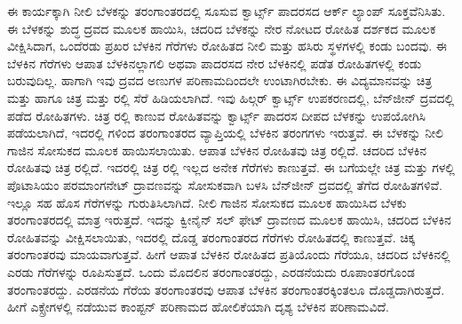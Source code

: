ಈ ಕಾರ್ಯಕ್ಕಾಗಿ ನೀಲಿ ಬೆಳಕನ್ನು  ತರಂಗಾಂತರದಲ್ಲಿ ಸೂಸುವ ಕ್ವಾರ್ಟ್ಸ್ ಪಾದರಸದ ಆರ್ಕ್ ಲ್ಯಾಂಪ್ ಸೂಕ್ತವೆನಿಸಿತು. ಈ ಬೆಳಕನ್ನು ಶುದ್ಧ ದ್ರವದ ಮೂಲಕ ಹಾಯಿಸಿ, ಚದರಿದ ಬೆಳಕನ್ನು ನೇರ ನೋಟದ ರೋಹಿತ ದರ್ಶಕದ ಮೂಲಕ ವೀಕ್ಷಿಸಿದಾಗ, ಒಂದೆರಡು ಪ್ರಖರ ಬೆಳಕಿನ ಗೆರೆಗಳು ರೋಹಿತದ ನೀಲಿ ಮತ್ತು ಹಸಿರು ಸ್ಥಳಗಳಲ್ಲಿ ಕಂಡು ಬಂದವು. ಈ ಬೆಳಕಿನ ಗೆರೆಗಳು ಆಪಾತ ಬೆಳಕಿನಲ್ಲಾಗಲಿ ಅಥವಾ ಪಾದರಸದ ನೇರ ಬೆಳಕಿನಲ್ಲಿ ಪಡೆತ ರೋಹಿತಗಳಲ್ಲಿ ಕಂಡು ಬರುವುದಿಲ್ಲ. ಹಾಗಾಗಿ ಇವು ದ್ರವದ ಅಣುಗಳ ಪರಿಣಾಮದಿಂದಲೇ ಉಂಟಾಗಿರಬೇಕು. ಈ ವಿದ್ಯಮಾನವನ್ನು ಚಿತ್ರ  ಮತ್ತು  ಹಾಗೂ ಚಿತ್ರ  ಮತ್ತು ರಲ್ಲಿ ಸೆರೆ ಹಿಡಿಯಲಾಗಿದೆ. ಇವು ಹಿಲ್ಗರ್ ಕ್ವಾರ್ಟ್ಸ್ ಉಪಕರಣದಲ್ಲಿ, ಬೆನ್‍ಜೀನ್ ದ್ರವದಲ್ಲಿ ಪಡೆದ ರೋಹಿತಗಳು. ಚಿತ್ರ ರಲ್ಲಿ ಕಾಣುವ ರೋಹಿತವನ್ನು ಕ್ವಾರ್ಟ್ಸ್ ಪಾದರಸ ದೀಪದ ಬೆಳಕನ್ನು ಉಪಯೋಗಿಸಿ ಪಡೆಯಲಾಗಿದೆ, ಇದರಲ್ಲಿ  ಗಳಿಂದ  ತರಂಗಾಂತರದ ವ್ಯಾಪ್ತಿಯಲ್ಲಿ ಬೆಳಕಿನ ತರಂಗಗಳು ಇರುತ್ತವೆ. ಈ ಬೆಳಕನ್ನು ನೀಲಿ ಗಾಜಿನ ಸೋಸುಕದ ಮೂಲಕ ಹಾಯಿಸಲಾಯಿತು. ಆಪಾತ ಬೆಳಕಿನ ರೋಹಿತವು ಚಿತ್ರ ರಲ್ಲಿದೆ. ಚದರಿದ ಬೆಳಕಿನ ರೋಹಿತವು ಚಿತ್ರ ರಲ್ಲಿದೆ. ಇದರಲ್ಲಿ ಚಿತ್ರ ರಲ್ಲಿ ಇಲ್ಲದ ಅನೇಕ ಗೆರೆಗಳು ಕಾಣುತ್ತವೆ. ಈ ಬಗೆಯಲ್ಲೇ ಚಿತ್ರ  ಮತ್ತು  ಗಳಲ್ಲಿ ಪೊಟಾಸಿಯಂ ಪರಮಾಂಗನೇಟ್ ದ್ರಾವಣವನ್ನು ಸೋಸುಕವಾಗಿ ಬಳಸಿ ಬೆನ್‍ಜೀನ್ ದ್ರವದಲ್ಲಿ ತೆಗೆದ ರೋಹಿತಗಳಿವೆ. ಇಲ್ಲೂ ಸಹ ಹೊಸ ಗೆರೆಗಳನ್ನು ಗುರುತಿಸಿಲಾಗಿದೆ. ನೀಲಿ ಗಾಜಿನ ಸೋಸುಕದ ಮೂಲಕ ಹಾಯಿಸಿದ ಬೆಳಕು  ತರಂಗಾಂತರದಲ್ಲಿ ಮಾತ್ರ ಇರುತ್ತದೆ. ಇದನ್ನು ಕ್ವೀನೈನ್ ಸಲ್ ಫೇಟ್ ದ್ರಾವಣದ ಮೂಲಕ ಹಾಯಿಸಿ, ಚದರಿದ ಬೆಳಕಿನ ರೋಹಿತವನ್ನು ವೀಕ್ಷಿಸಲಾಯಿತು, ಇದರಲ್ಲಿ ದೊಡ್ಡ ತರಂಗಾಂತರದ ಗೆರೆಗಳು ರೋಹಿತದಲ್ಲಿ ಕಾಣುತ್ತವೆ. ಚಿಕ್ಕ ತರಂಗಾಂತರವು ಮಾಯವಾಗುತ್ತವೆ. ಹೀಗೆ ಆಪಾತ ಬೆಳಕಿನ ರೋಹಿತದ ಪ್ರತಿಯೊಂದು ಗೆರೆಯೂ, ಚದರಿದ ಬೆಳಕಿನಲ್ಲಿ ಎರಡು ಗೆರೆಗಳನ್ನು ರೂಪಿಸುತ್ತದೆ. ಒಂದು ಮೊದಲಿನ ತರಂಗಾಂತರದ್ದು, ಎರಡನೆಯದು ರೂಪಾಂತರಗೊಂಡ ತರಂಗಾಂತರದ್ದು. ಎರಡನೆಯ ಗೆರೆಯ ತರಂಗಾಂತರವು ಆಪಾತ ಬೆಳಕಿನ ತರಂಗಾಂತರಕ್ಕಿಂತಲೂ ದೊಡ್ಡದಾಗಿರುತ್ತದೆ. ಹೀಗೆ ಎಕ್ಸ್\enginline{-}ರೇಗಳಲ್ಲಿ ನಡೆಯುವ ಕಾಂಪ್ಟನ್ ಪರಿಣಾಮದ ಹೋಲಿಕೆಯಾಗಿ ದೃಶ್ಯ ಬೆಳಕಿನ ಪರಿಣಾಮವಿದೆ.

\vskip -5pt

